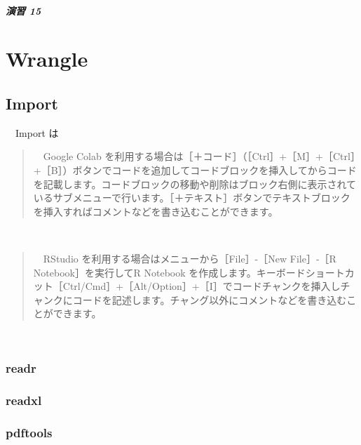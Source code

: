 \documentclass[
  12pt,
]{book}
\begin{document}
\hypertarget{ux6f14ux7fd2-15}{%
\subsubsection*{演習 15}\label{ux6f14ux7fd2-15}}

\hypertarget{part-wrangle}{%
\part{Wrangle}\label{part-wrangle}}

\hypertarget{import-1}{%
\chapter{Import}\label{import-1}}

　Import は

\begin{quote}
　Google Colab を利用する場合は［＋コード］（［Ctrl］+［M］+［Ctrl］+［B］）ボタンでコードを追加してコードブロックを挿入してからコードを記載します。コードブロックの移動や削除はブロック右側に表示されているサブメニューで行います。［＋テキスト］ボタンでテキストブロックを挿入すればコメントなどを書き込むことができます。
\end{quote}

　

\begin{quote}
　RStudio を利用する場合はメニューから［File］-［New File］-［R Notebook］を実行してR Notebook を作成します。キーボードショートカット［Ctrl/Cmd］+［Alt/Option］+［I］でコードチャンクを挿入しチャンクにコードを記述します。チャング以外にコメントなどを書き込むことができます。
\end{quote}

　

\hypertarget{readr}{%
\section{readr}\label{readr}}

\hypertarget{readxl}{%
\section{readxl}\label{readxl}}

\hypertarget{pdftools}{%
\section{pdftools}\label{pdftools}}
\end{document}
